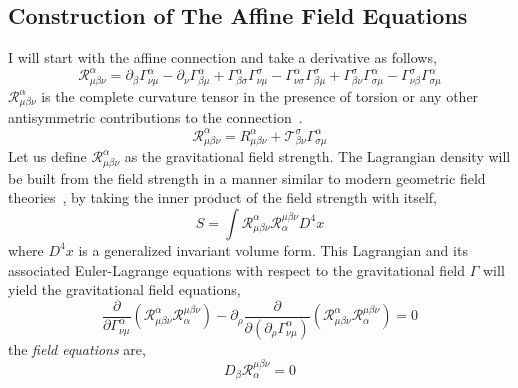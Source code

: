 \documentclass[aps,prd,preprint]{revtex4-1}
\begin{document}
\subsection*{Construction of The Affine Field Equations}
I will start with the affine connection and take a derivative as follows,
\begin{equation}
    \mathcal{R}^\alpha_{\mu\beta\nu} = \partial_{\beta}\Gamma^{\alpha}_{\nu\mu}-\partial_{\nu}\Gamma^{\alpha}_{\beta\mu}+\Gamma^{\alpha}_{\beta\sigma}\Gamma^{\sigma}_{\nu\mu} - \Gamma^{\alpha}_{\nu\sigma}\Gamma^{\sigma}_{\beta\mu} + \Gamma^{\sigma}_{\beta\nu}\Gamma^{\alpha}_{\sigma\mu}-\Gamma^{\sigma}_{\nu\beta}\Gamma^{\alpha}_{\sigma\mu}
\end{equation}
$\mathcal{R}^\alpha_{\mu\beta\nu}$ is the complete curvature tensor in the presence of torsion or any other antisymmetric contributions to the connection~\cite{watanabe_2004}.
\begin{equation}
    \mathcal{R}^\alpha_{\mu\beta\nu}=R^{\alpha}_{\mu\beta\nu}+\mathcal{T}^{\sigma}_{\beta\nu}\Gamma^{\alpha}_{\sigma\mu}
\end{equation}
Let us define $\mathcal{R}^\alpha_{\mu\beta\nu}$ as the gravitational field strength. The Lagrangian density will be built from the field strength in a manner similar to modern geometric field theories~\cite{peskin_1995,weinberg_1995}, by taking the inner product of the field strength with itself,
\begin{equation}\label{higher_order_action}
    S=\int{\mathcal{R}^\alpha_{\mu\beta\nu}\mathcal{R}_\alpha^{\mu\beta\nu}D^4x}
\end{equation}
where $D^4x$ is a generalized invariant volume form.
This Lagrangian and its associated Euler-Lagrange equations with respect to the gravitational field $\Gamma$ will yield the gravitational field equations,
\begin{equation}\label{euler-lagrange}
    \frac{\partial}{\partial\Gamma^{\alpha}_{\nu\mu}}\left(\mathcal{R}^\alpha_{\mu\beta\nu}\mathcal{R}_\alpha^{\mu\beta\nu}\right) - \partial_{\rho}\frac{\partial}{\partial(\partial_{\rho}\Gamma^{\alpha}_{\nu\mu})}\left(\mathcal{R}^\alpha_{\mu\beta\nu}\mathcal{R}_\alpha^{\mu\beta\nu}\right) = 0
\end{equation}
the {\it field equations\/} are,
\begin{equation}\label{higher_order_field_eq}
    D_\beta \mathcal{R}_\alpha^{\mu\beta\nu} = 0
\end{equation}
\end{document}
